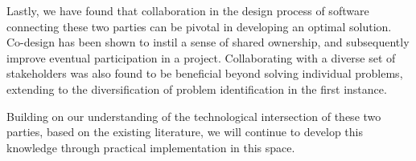 Lastly, we have found that collaboration in the design process of software connecting these two parties can be pivotal in developing an optimal solution. Co-design has been shown to instil a sense of shared ownership, and subsequently improve eventual participation in a project. Collaborating with a diverse set of stakeholders was also found to be beneficial beyond solving individual problems, extending to the diversification of problem identification in the first instance.

Building on our understanding of the technological intersection of these two parties, based on the existing literature, we will continue to develop this knowledge through practical implementation in this space.